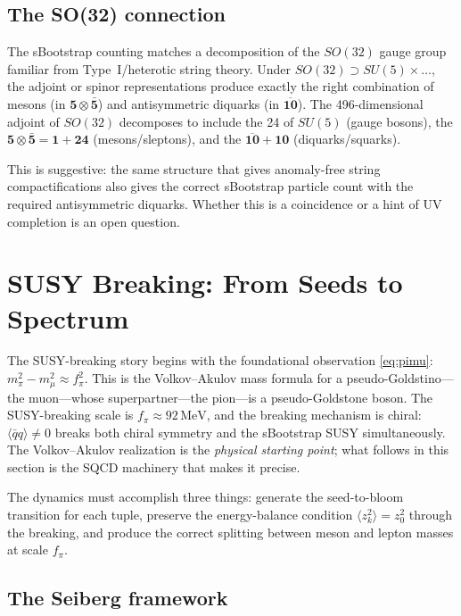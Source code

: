 \documentclass[12pt,a4paper]{article}
\newcommand{\MeV}{\,\text{MeV}}
\newcommand{\qqbar}{\langle\bar{q}q\rangle}
\begin{document}
\subsection{The SO(32) connection}

The sBootstrap counting matches a decomposition of the $SO(32)$ gauge 
group familiar from Type~I/heterotic string theory. Under 
$SO(32) \supset SU(5) \times \ldots$, the adjoint or spinor 
representations produce exactly the right combination of mesons 
(in $\mathbf{5} \otimes \bar{\mathbf{5}}$) and antisymmetric 
diquarks (in $\overline{\mathbf{10}}$). The 496-dimensional adjoint 
of $SO(32)$ decomposes to include the 24 of $SU(5)$ (gauge bosons), 
the $\mathbf{5} \otimes \bar{\mathbf{5}} = \mathbf{1} + \mathbf{24}$ 
(mesons/sleptons), and the $\overline{\mathbf{10}} + \mathbf{10}$ 
(diquarks/squarks).

This is suggestive: the same structure that gives anomaly-free string 
compactifications also gives the correct sBootstrap particle count 
with the required antisymmetric diquarks. Whether this is a 
coincidence or a hint of UV completion is an open question.

\section{SUSY Breaking: From Seeds to Spectrum}
\label{sec:breaking}

The SUSY-breaking story begins with the foundational observation 
\eqref{eq:pimu}: $m_\pi^2 - m_\mu^2 \approx f_\pi^2$. This is the 
Volkov--Akulov mass formula for a pseudo-Goldstino---the muon---whose 
superpartner---the pion---is a pseudo-Goldstone boson. The SUSY-breaking 
scale is $f_\pi \approx 92\MeV$, and the breaking mechanism is chiral: 
$\qqbar \neq 0$ breaks both chiral symmetry and the sBootstrap SUSY 
simultaneously. The Volkov--Akulov realization is the \emph{physical 
starting point}; what follows in this section is the SQCD machinery 
that makes it precise.

The dynamics must accomplish three things: generate the seed-to-bloom 
transition for each tuple, preserve the energy-balance condition 
$\langle z_k^2\rangle = z_0^2$ through the breaking, and produce 
the correct splitting between meson and lepton masses at scale $f_\pi$.

\subsection{The Seiberg framework}
\end{document}
